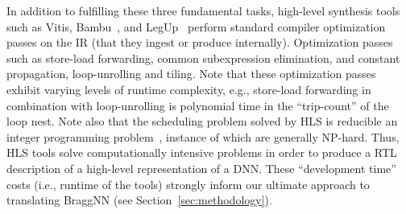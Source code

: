 In addition to fulfilling these three fundamental tasks, high-level synthesis tools such as Vitis, Bambu~\cite{ferrandi2021bambu}, and LegUp~\cite{10.1145/2514740} perform standard compiler optimization passes on the IR (that they ingest or produce internally).
Optimization passes such as store-load forwarding, common subexpression elimination, and constant propagation, loop-unrolling and tiling.
Note that these optimization passes exhibit varying levels of runtime complexity, e.g., store-load forwarding in combination with loop-unrolling is polynomial time in the ``trip-count'' of the loop nest.
Note also that the scheduling problem solved by HLS is reducible an integer programming problem~\cite{tuprints9272}, instance of which are generally NP-hard.
Thus, HLS tools solve computationally intensive problems in order to produce a RTL description of a high-level representation of a DNN.
These ``development time'' costs (i.e., runtime of the tools) strongly inform our ultimate approach to translating BraggNN (see Section~\ref{sec:methodology}). 

